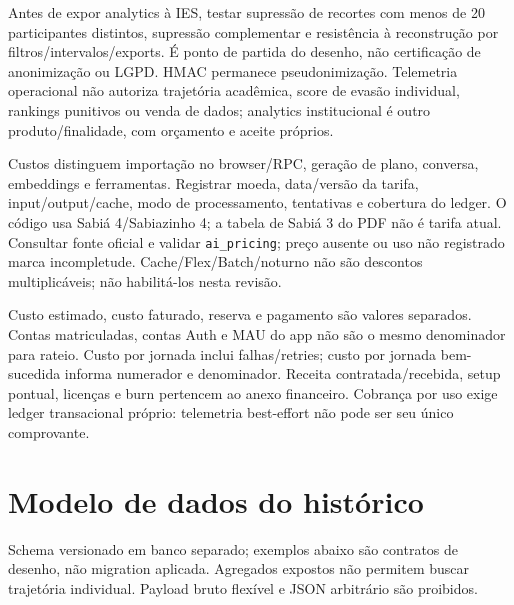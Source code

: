 \documentclass[10pt,a4paper]{article}
\begin{document}
Antes de expor analytics à IES, testar supressão de recortes com menos
de 20 participantes distintos, supressão complementar e resistência à
reconstrução por filtros/intervalos/exports. É ponto de partida do
desenho, não certificação de anonimização ou LGPD. HMAC permanece
pseudonimização. Telemetria operacional não autoriza trajetória
acadêmica, score de evasão individual, rankings punitivos ou venda de
dados; analytics institucional é outro produto/finalidade, com orçamento
e aceite próprios.

Custos distinguem importação no browser/RPC, geração de plano, conversa,
embeddings e ferramentas. Registrar moeda, data/versão da tarifa,
input/output/cache, modo de processamento, tentativas e cobertura do
ledger. O código usa Sabiá 4/Sabiazinho 4; a tabela de Sabiá 3 do PDF
não é tarifa atual. Consultar fonte oficial e validar
{\footnotesize\ttfamily\nolinkurl{ai_pricing}}; preço ausente ou uso não registrado marca
incompletude. Cache/Flex/Batch/noturno não são descontos multiplicáveis;
não habilitá-los nesta revisão.

Custo estimado, custo faturado, reserva e pagamento são valores
separados. Contas matriculadas, contas Auth e MAU do app não são o mesmo
denominador para rateio. Custo por jornada inclui falhas/retries; custo
por jornada bem-sucedida informa numerador e denominador. Receita
contratada/recebida, setup pontual, licenças e burn pertencem ao anexo
financeiro. Cobrança por uso exige ledger transacional próprio:
telemetria best-effort não pode ser seu único comprovante.

\clearpage
\section{Modelo de dados do
histórico}\label{modelo-de-dados-do-histuxf3rico}

Schema versionado em banco separado; exemplos abaixo são contratos de
desenho, não migration aplicada. Agregados expostos não permitem buscar
trajetória individual. Payload bruto flexível e JSON arbitrário são
proibidos.
\end{document}
